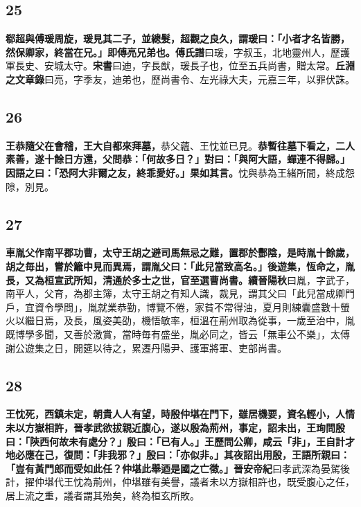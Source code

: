 \subsection*{25}

\textbf{郗超與傅瑗周旋，瑗見其二子，並總髮，超觀之良久，謂瑗曰：「小者才名皆勝，然保卿家，終當在兄。」即傅亮兄弟也。}{\footnotesize \textbf{傅氏譜}曰瑗，字叔玉，北地靈州人，歷護軍長史、安城太守。\textbf{宋書}曰迪，字長猷，瑗長子也，位至五兵尚書，贈太常。\textbf{丘淵之文章錄}曰亮，字季友，迪弟也，歷尚書令、左光祿大夫，元嘉三年，以罪伏誅。}

\subsection*{26}

\textbf{王恭隨父在會稽，王大自都來拜墓，}{\footnotesize 恭父蘊、王忱並已見。}\textbf{恭暫往墓下看之，二人素善，遂十餘日方還，父問恭：「何故多日？」對曰：「與阿大語，蟬連不得歸。」因語之曰：「恐阿大非爾之友，終乖愛好。」果如其言。}{\footnotesize 忱與恭為王緒所間，終成怨隙，別見。}

\subsection*{27}

\textbf{車胤父作南平郡功曹，太守王胡之避司馬無忌之難，置郡於酆陰，是時胤十餘歲，胡之毎出，嘗於籬中見而異焉，謂胤父曰：「此兒當致高名。」後遊集，恆命之，胤長，又為桓宣武所知，清通於多士之世，官至選曹尚書。}{\footnotesize \textbf{續晉陽秋}曰胤，字武子，南平人，父育，為郡主簿，太守王胡之有知人識，裁見，謂其父曰「此兒當成卿門戶，宜資令學問」，胤就業恭勤，博覽不倦，家貧不常得油，夏月則練囊盛數十螢火以繼日焉，及長，風姿美劭，機悟敏率，桓溫在荊州取為從事，一歲至治中，胤既博學多聞，又善於激賞，當時毎有盛坐，胤必同之，皆云「無車公不樂」，太傅謝公遊集之日，開筵以待之，累遷丹陽尹、護軍將軍、吏部尚書。}

\subsection*{28}

\textbf{王忱死，西鎮未定，朝貴人人有望，時殷仲堪在門下，雖居機要，資名輕小，人情未以方嶽相許，晉孝武欲拔親近腹心，遂以殷為荊州，事定，詔未出，王珣問殷曰：「陝西何故未有處分？」殷曰：「已有人。」王歷問公卿，咸云「非」，王自計才地必應在己，復問：「非我邪？」殷曰：「亦似非。」其夜詔出用殷，王語所親曰：「豈有黃門郎而受如此任？仲堪此舉迺是國之亡徵。」}{\footnotesize \textbf{晉安帝紀}曰孝武深為晏駕後計，擢仲堪代王忱為荊州，仲堪雖有美譽，議者未以方嶽相許也，既受腹心之任，居上流之重，議者謂其殆矣，終為桓玄所敗。}